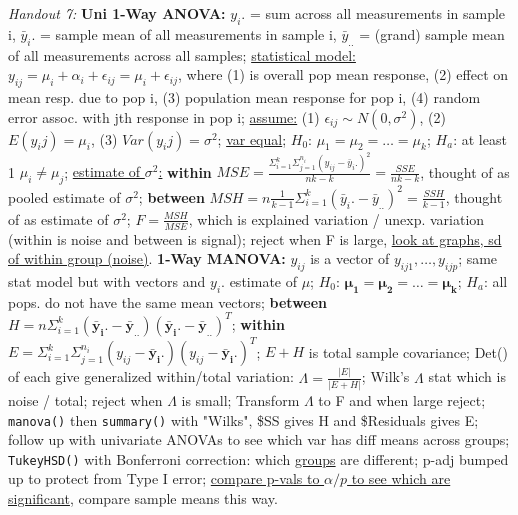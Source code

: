 \documentclass[9pt]{extarticle}
\begin{document}
\textit{Handout 7:}
\textbf{Uni 1-Way ANOVA:} $y_i.$ = sum across all measurements in sample i, 
$\bar{y}_i.$ = sample mean of all measurements in sample i, $\bar{y}_{..}$ =
(grand) sample mean of all measurements across all samples; \underline{statistical
model:} $y_{ij} = \mu_i + \alpha_i + \epsilon_{ij} = \mu_i + \epsilon_{ij}$, 
where (1) is overall pop mean response, (2) effect on mean resp. due to pop i, 
(3) population mean response for pop i, (4) random error assoc. with jth response 
in pop i; \underline{assume:} (1) $\epsilon_{ij} \sim N(0, \sigma^2)$, (2) 
$E(y_ij) = \mu_i$, (3) $Var(y_ij) = \sigma^2$; \underline{var equal}; $H_0$:
$\mu_1 = \mu_2 = \ldots = \mu_k$; $H_a$: at least 1 $\mu_i \neq \mu_j$; 
\underline{estimate of $\sigma^2$:} \textbf{within} $MSE = \frac{\Sigma_{i=1}^k
\Sigma_{j=1}^{n_i}(y_{ij} - \bar{y}_i.)^2}{nk - k} = 
\frac{SSE}{nk - k}$, thought of as pooled estimate of $\sigma^2$; \textbf{between}
$MSH = n\frac{1}{k-1}\Sigma_{i=1}^k(\bar{y}_i. - \bar{y}_{..})^2 =
\frac{SSH}{k-1}$, thought of as estimate of $\sigma^2$; $F = \frac{MSH}{MSE}$, 
which is explained variation / unexp. variation (within is noise and between 
is signal); reject when F is large, \underline{look at graphs, sd of within 
group (noise)}.
\textbf{1-Way MANOVA:} $y_{ij}$ is a vector of $y_{ij1}, \ldots, y_{ijp}$; 
same stat model but with vectors and $y_i.$ estimate of $\mu$; $H_0$:
$\boldsymbol{\mu_1 = \mu_2 = \ldots = \mu_k}$; $H_a$: all pops. do not have 
the same mean vectors; \textbf{between} $H = n\Sigma_{i=1}^k(\boldsymbol{\bar{y}_i.}
- \boldsymbol{\bar{y}_{..}})(\boldsymbol{\bar{y}_i.} - \boldsymbol{\bar{y}_{..}})^T$;
\textbf{within} $E = \Sigma_{i=1}^k\Sigma_{j=1}^{n_i}(y_{ij} - \boldsymbol{\bar{y}_i.})
(y_{ij} - \boldsymbol{\bar{y}_i.})^T$; $E + H$ is total sample covariance;
Det() of each give generalized within/total variation: $\Lambda = \frac{|E|}{
|E + H|}$; Wilk's $\Lambda$ stat which is noise / total; reject 
when $\Lambda$ is small; Transform $\Lambda$ to F and when large reject; 
\texttt{manova()} then \texttt{summary()} with "Wilks", \$SS gives H and 
\$Residuals gives E; follow up with univariate ANOVAs to see which var has
diff means across groups; \texttt{TukeyHSD()} with Bonferroni correction: which 
\underline{groups} are different; p-adj bumped up to protect from Type I error; 
\underline{compare p-vals to $\alpha / p$ to see which are significant}, compare 
sample means this way.\\
\end{document}
